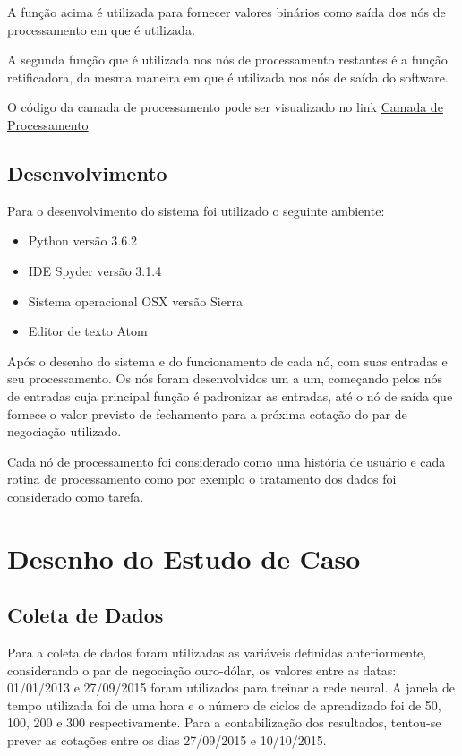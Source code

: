 A função acima é utilizada para fornecer valores binários como saída dos nós de processamento em que é utilizada.

A segunda função que é utilizada nos nós de processamento restantes é a função retificadora, da mesma maneira em que é utilizada nos
nós de saída do software.

O código da camada de processamento pode ser visualizado no link  \href{https://github.com/matmello/brainbot/tree/master/hidden}{Camada de Processamento}


\subsection[Desenvolvimento]{Desenvolvimento}

Para o desenvolvimento do sistema foi utilizado o seguinte ambiente:

\begin{itemize}
  \item Python versão 3.6.2
  \item IDE Spyder versão 3.1.4
  \item Sistema operacional OSX versão Sierra
  \item Editor de texto Atom
\end{itemize}

Após o desenho do sistema e do funcionamento de cada nó, com suas entradas e seu processamento. Os nós foram desenvolvidos
um a um, começando pelos nós de entradas cuja principal função é padronizar as entradas, até o nó de saída que fornece o valor previsto
de fechamento para a próxima cotação do par de negociação utilizado.

Cada nó de processamento foi considerado como uma história de usuário e cada rotina de processamento como por exemplo o tratamento dos dados
foi considerado como tarefa.

\section[Desenho do Estudo de Caso]{Desenho do Estudo de Caso}

\subsection[Coleta de Dados]{Coleta de Dados}

Para a coleta de dados foram utilizadas as variáveis definidas anteriormente, considerando o par de negociação ouro-dólar, os valores entre
as datas: 01/01/2013 e 27/09/2015 foram utilizados para treinar a rede neural. A janela de tempo utilizada foi de uma hora e o número de ciclos de aprendizado foi de 50, 100, 200 e 300 respectivamente.
Para a contabilização dos resultados, tentou-se prever as cotações entre os dias 27/09/2015 e 10/10/2015.

